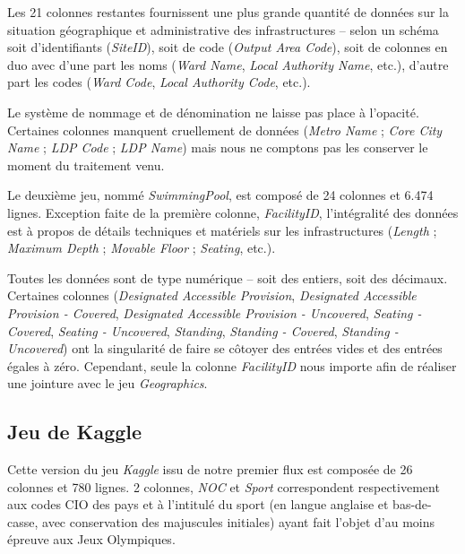 \documentclass[hidelinks, 12pt]{report}
\begin{document}
Les 21 colonnes restantes fournissent une plus grande quantité de données sur la situation géographique et administrative des infrastructures -- selon un schéma soit d'identifiants (\textit{SiteID}), soit de code (\textit{Output Area Code}), soit de colonnes en duo avec d'une part les noms (\textit{Ward Name}, \textit{Local Authority Name}, etc.), d'autre part les codes (\textit{Ward Code}, \textit{Local Authority Code}, etc.).

Le système de nommage et de dénomination ne laisse pas place à l'opacité. Certaines colonnes manquent cruellement de données (\textit{Metro Name} ; \textit{Core City Name} ; \textit{LDP Code} ; \textit{LDP Name}) mais nous ne comptons pas les conserver le moment du traitement venu.
\newline

Le deuxième jeu, nommé \textit{SwimmingPool}, est composé de 24 colonnes et 6.474 lignes. Exception faite de la première colonne, \textit{FacilityID}, l'intégralité des données est à propos de détails techniques et matériels sur les infrastructures (\textit{Length} ; \textit{Maximum Depth} ; \textit{Movable Floor} ; \textit{Seating}, etc.).

Toutes les données sont de type numérique -- soit des entiers, soit des décimaux. Certaines colonnes (\textit{Designated Accessible Provision}, \textit{Designated Accessible Provision - Covered}, \textit{Designated Accessible Provision - Uncovered}, \textit{Seating - Covered}, \textit{Seating - Uncovered}, \textit{Standing}, \textit{Standing - Covered}, \textit{Standing - Uncovered}) ont la singularité de faire se côtoyer des entrées vides et des entrées égales à zéro. Cependant, seule la colonne \emph{FacilityID} nous importe afin de réaliser une jointure avec le jeu \textit{Geographics}.





%





\subsection{Jeu de Kaggle}

Cette version du jeu \textit{Kaggle} issu de notre premier flux est composée de 26 colonnes et 780 lignes. 2 colonnes, \textit{NOC} et \textit{Sport} correspondent respectivement aux codes CIO des pays et à l'intitulé du sport (en langue anglaise et bas-de-casse, avec conservation des majuscules initiales) ayant fait l'objet d'au moins épreuve aux Jeux Olympiques.
\end{document}
